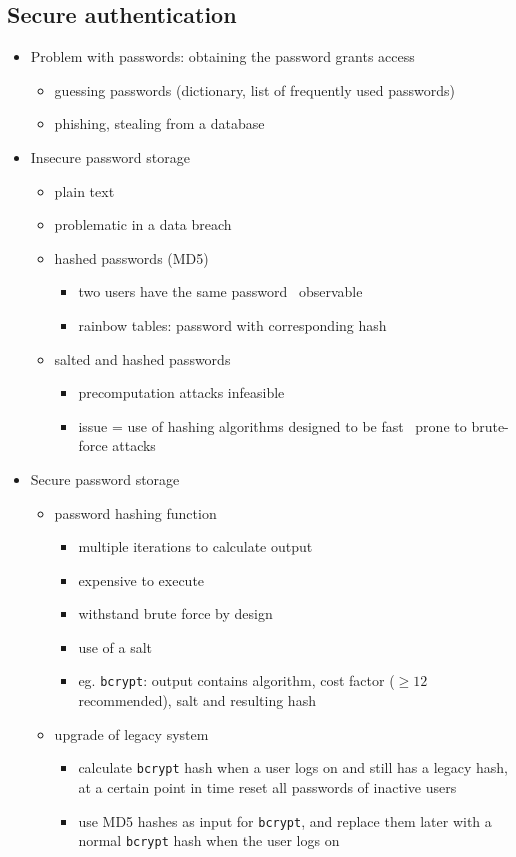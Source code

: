 \documentclass[12pt,titlepage,a4paper]{report}
\begin{document}
	\subsection{Secure authentication}
	 \begin{itemize}
	 	\item Problem with passwords: obtaining the password grants access
	 	\begin{itemize}
	 		\item guessing passwords (dictionary, list of frequently used passwords)
	 		\item phishing, stealing from a database
	 	\end{itemize}
 		\item Insecure password storage
 		\begin{itemize}
 			\item plain text
 			\item problematic in a data breach
 			\item hashed passwords (MD5)
 			\begin{itemize}
 				\item two users have the same password \textrightarrow \, observable
 				\item rainbow tables: password with corresponding hash
 			\end{itemize}
 			\item salted and hashed passwords
 			\begin{itemize}
 				\item precomputation attacks infeasible
 				\item issue = use of hashing algorithms
 					\subitem designed to be fast \textrightarrow \, prone to brute-force attacks
 			\end{itemize}
 		\end{itemize}
 		
 		\item Secure password storage
 		\begin{itemize}
 			\item password hashing function
 			\begin{itemize}
				\item multiple iterations to calculate output
 				\item expensive to execute
 				\item withstand brute force by design
 				\item use of a salt
 				\item eg. \texttt{bcrypt}: output contains algorithm, cost factor ($\geq 12$ recommended), salt and resulting hash
 			\end{itemize}
 			\item upgrade of legacy system
 			\begin{itemize}
 				\item calculate \texttt{bcrypt} hash when a user logs on and still has a legacy hash, at a certain point in time reset all passwords of inactive users
 				\item use MD5 hashes as input for \texttt{bcrypt}, and replace them later with a normal \texttt{bcrypt} hash when the user logs on
 			\end{itemize}
 		\end{itemize}
 	

\end{itemize}
\end{document}
